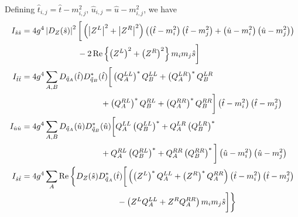 \documentclass[english,notitlepage]{article}
\begin{document}
    Defining \(\hat{t}_{i, j} = \hat{t} - m_{i, j}^2\), \(\hat{u}_{i, j} = \hat{u} - m_{i, j}^2\), we have
    \begin{subequations}
        \begin{align}
            \nonumber
            I_{\hat{s}\hat{s}} & = 4 g^4 \abs{D_Z(\hat{s})}^2 \bigg[ \pclosed{\abs{Z^L}^2 + \abs{Z^R}^2} \pclosed{\pclosed{\hat{t}-m_i^2}\pclosed{\hat{t}-m_j^2} + \pclosed{\hat{u}-m_i^2}\pclosed{\hat{u}-m_j^2}}                                                      \\
                               & \hspace{2.4cm} - 2\Re{\pclosed{Z^L}^2 + \pclosed{Z^R}^2} m_i m_j \hat{s} \bigg]                                                                                                                                                        \\
            \nonumber
            I_{\hat{t}\hat{t}} & = 4 g^4 \sum_{A, B} D_{\tilde{q}_A}(\hat{t}) D^\ast_{\tilde{q}_B}(\hat{t}) \bigg[\pclosed{Q_A^{LL}}^\ast Q_B^{LL} + \pclosed{Q_A^{LR}}^\ast Q_B^{LR}                                                                                   \\
                               & \hspace{3.4cm} + \pclosed{Q_A^{RL}}^\ast Q_B^{RL} + \pclosed{Q_A^{RR}}^\ast Q_B^{RR}\bigg] \pclosed{\hat{t}-m_i^2} \pclosed{\hat{t}-m_j^2}                                                                                             \\
            \nonumber
            I_{\hat{u}\hat{u}} & = 4 g^4 \sum_{A, B} D_{\tilde{q}_A}(\hat{u}) D^\ast_{\tilde{q}_B}(\hat{u}) \bigg[Q_A^{LL}\pclosed{Q_B^{LL}}^\ast + Q_A^{LR}\pclosed{Q_B^{LR}}^\ast                                                                                     \\
                               & \hspace{3.4cm} + Q_A^{RL}\pclosed{Q_B^{RL}}^\ast + Q_A^{RR}\pclosed{Q_B^{RR}}^\ast\bigg] \pclosed{\hat{u}-m_i^2} \pclosed{\hat{u}-m_j^2}                                                                                               \\
            \nonumber
            I_{\hat{s}\hat{t}} & = 4 g^4 \sum_{A} \operatorname{Re} \bigg\{ D_Z(\hat{s}) D^\ast_{\tilde{q}_A}(\hat{t}) \bigg[\pclosed{\pclosed{Z^L}^\ast Q_A^{LL} + \pclosed{Z^R}^\ast Q_A^{RR}} \pclosed{\hat{t} - m_i^2} \pclosed{\hat{t} - m_j^2}                    \\
                               & \hspace{4.1cm} - \pclosed{Z^L Q_A^{LL} + Z^R Q_A^{RR}} m_i m_j \hat{s}  \bigg] \bigg\}                                                                                                                                                 \\

\end{align}
\end{subequations}
\end{document}

